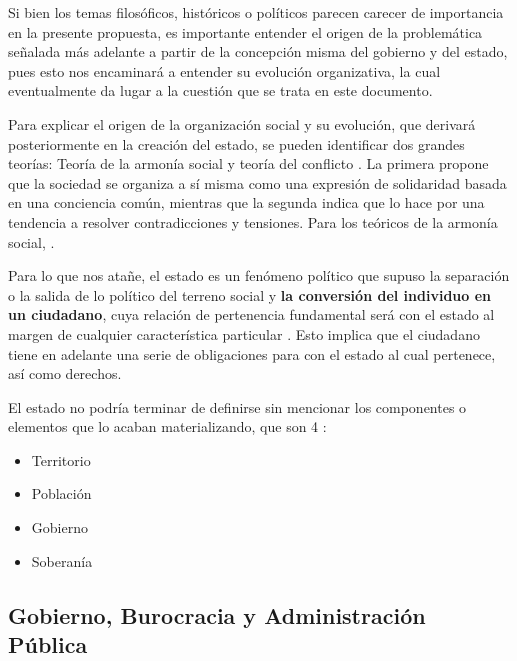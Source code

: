 Si bien los temas filosóficos, históricos o políticos parecen carecer de importancia en la presente propuesta,
es importante entender el origen de la problemática señalada más adelante a partir de la concepción misma del gobierno y del estado, pues esto nos encaminará a entender su evolución organizativa,
la cual eventualmente da lugar a la cuestión que se trata en este documento.

Para explicar el origen de la organización social y su evolución, que derivará posteriormente en la creación del estado, se pueden identificar dos grandes teorías: 
Teoría de la armonía social y teoría del conflicto \cite{vacarofernandezOrigenEstado2000}. 
La primera propone que la sociedad se organiza a sí misma como una expresión de solidaridad basada en una conciencia común, 
mientras que la segunda indica que lo hace por una tendencia a resolver contradicciones y tensiones. 
Para los teóricos de la armonía social, \cite[3]{vacarofernandezOrigenEstado2000}.

Para lo que nos atañe, el estado es un fenómeno político que supuso la separación o la salida de lo político del terreno social y 
\textbf{la conversión del individuo en un ciudadano}, cuya relación de pertenencia fundamental será con el estado al margen de cualquier característica particular \cite{gordilloperezPorQueSurge2017}.
Esto implica que el ciudadano tiene en adelante una serie de obligaciones para con el estado al cual pertenece, así como derechos.

El estado no podría terminar de definirse sin mencionar los componentes o elementos que lo acaban materializando, que son 4 \cite{delarocharadaElementosParaTeoria2019}:

\begin{itemize}
    \item Territorio
    \item Población
    \item Gobierno
    \item Soberanía
\end{itemize}

\subsection{Gobierno, Burocracia y Administración Pública}

